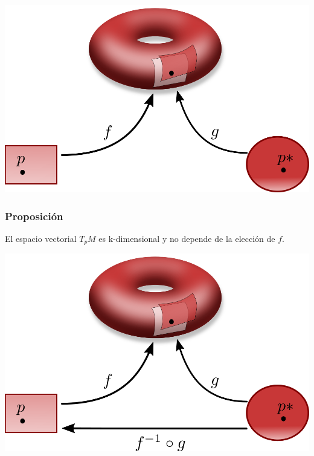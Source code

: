 \documentclass[spanish]{beamer}
\begin{document}
\begin{frame}
    \includegraphics[width=\textwidth]{../gfx/toro-4}
\end{frame}

\begin{frame}
    \frametitle{Proposici\'on}
    El espacio vectorial $T_{p}M$ es k-dimensional y no depende de la elecci\'on de $f$.
\end{frame}

\begin{frame}
    \includegraphics[width=\textwidth]{../gfx/toro-5}
\end{frame}
\end{document}
